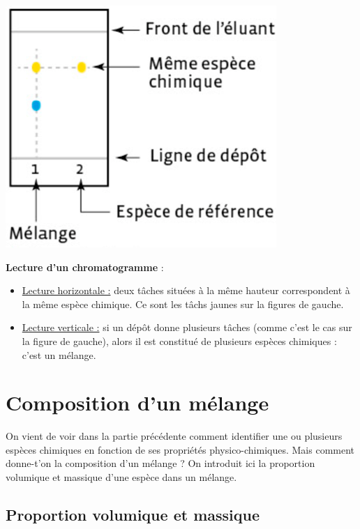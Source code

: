 \begin{minipage}[c]{0.4\textwidth}
    \includegraphics{Images/Chapitre_1/CCM.png}
\end{minipage}
\begin{minipage}[c]{0.6\textwidth}
    \textbf{Lecture d'un chromatogramme} :
    \begin{itemize}
        \item \underline{Lecture horizontale :} deux tâches situées à la même hauteur correspondent à la même espèce chimique. Ce sont les tâchs jaunes sur la figures de gauche.
        \item  \underline{Lecture verticale :} si un dépôt donne plusieurs tâches (comme c'est le cas sur la figure de gauche), alors il est constitué de plusieurs espèces chimiques : c’est un mélange.
    \end{itemize}
\end{minipage}


\section{Composition d'un mélange}
On vient de voir dans la partie précédente comment identifier une ou plusieurs espèces chimiques en fonction de ses propriétés physico-chimiques. Mais comment donne-t'on la composition d'un mélange ? On introduit ici la proportion volumique et massique d'une espèce dans un mélange.

\subsection{Proportion volumique et massique}

